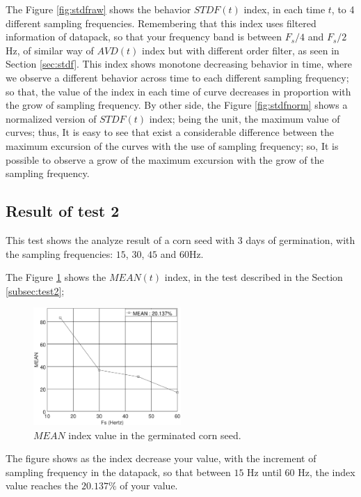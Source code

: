 \documentclass[review]{elsarticle}
\begin{document}
The Figure \ref{fig:stdfraw} shows the behavior $STDF(t)$ index, in each time $t$, 
to 4 different sampling frequencies. Remembering that this index uses filtered 
information of datapack, so that your frequency
band is between $F_s/4$ and $F_s/2$ Hz, of similar way of $AVD(t)$ index but with
different order filter, as seen in Section \ref{sec:stdf}.
This index shows monotone decreasing behavior in time, where we observe 
a different behavior across time to each different sampling frequency;
so that, the value of the index in each time of curve decreases in proportion with 
the grow of sampling frequency. By other side,
the Figure \ref{fig:stdfnorm} shows a normalized version of $STDF(t)$ index;
being the unit, the maximum value of curves; thus,
It is easy to see that exist a considerable difference between the maximum excursion 
of the curves with the use of sampling frequency; so, It is possible to observe a 
grow of the maximum excursion with the grow of the sampling frequency.

\subsection{Result of test 2}
\label{subsec:resulttest2}

This test shows the analyze result of a corn seed  with 3 days of germination,
with the sampling frequencies: $15$, $30$, $45$ and $60$Hz.

The Figure \ref{fig:MEANtest2} shows the $MEAN(t)$ index,
in the test described in the Section \ref{subsec:test2};
\begin{figure}[ht!]
    \centering
    \includegraphics[width=0.5\textwidth]{FPS_Semilla_3_3diasALLMEAN.eps}
    \caption{$MEAN$ index value in the germinated corn seed.}\label{fig:MEANtest2}
\end{figure}
The figure shows as the index decrease your value, 
with the increment of sampling frequency in the datapack,
so that between $15$ Hz until $60$ Hz, the index value reaches the $20.137\%$ of your value.
\end{document}
